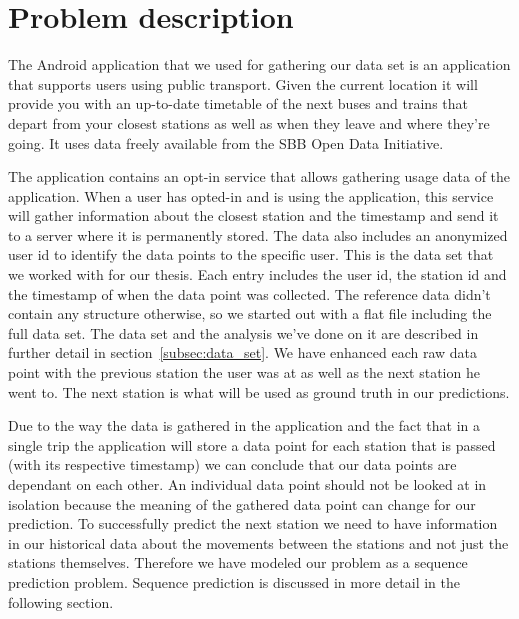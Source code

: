 \newpage
\section{Problem description}
The Android application that we used for gathering our data set is an application that supports users using public transport. Given the current location it will provide you with an up-to-date timetable of the next buses and trains that depart from your closest stations as well as when they leave and where they're going. It uses data freely available from the SBB Open Data Initiative. \cite{SBBOpenData} 

The application contains an opt-in service that allows gathering usage data of the application. When a user has opted-in and is using the application, this service will gather information about the closest station and the timestamp and send it to a server where it is permanently stored. The data also includes an anonymized user id to identify the data points to the specific user. This is the data set that we worked with for our thesis. Each entry includes the user id, the station id and the timestamp of when the data point was collected. The reference data didn't contain any structure otherwise, so we started out with a flat file including the full data set. The data set and the analysis we've done on it are described in further detail in section~\ref{subsec:data_set}. We have enhanced each raw data point with the previous station the user was at as well as the next station he went to. The next station is what will be used as ground truth in our predictions.

Due to the way the data is gathered in the application and the fact that in a single trip the application will store a data point for each station that is passed (with its respective timestamp) we can conclude that our data points are dependant on each other. An individual data point should not be looked at in isolation because the meaning of the gathered data point can change for our prediction. To successfully predict the next station we need to have information in our historical data about the movements between the stations and not just the stations themselves. Therefore we have modeled our problem as a sequence prediction problem. Sequence prediction is discussed in more detail in the following section. 

